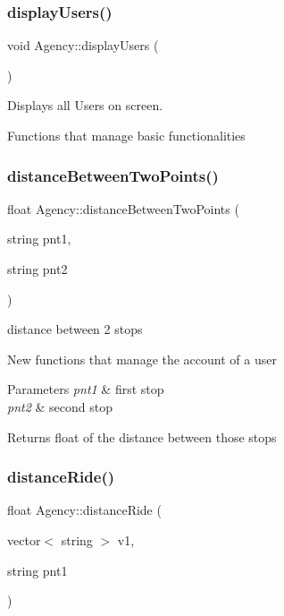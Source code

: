 \subsubsection{\texorpdfstring{display\+Users()}{displayUsers()}}
{\footnotesize\ttfamily void Agency\+::display\+Users (\begin{DoxyParamCaption}{ }\end{DoxyParamCaption})}



Displays all Users on screen. 

Functions that manage basic functionalities \mbox{\label{class_agency_a4efd6041c1293f0366b76356c05e3520}} 
\subsubsection{\texorpdfstring{distance\+Between\+Two\+Points()}{distanceBetweenTwoPoints()}}
{\footnotesize\ttfamily float Agency\+::distance\+Between\+Two\+Points (\begin{DoxyParamCaption}\item[{string}]{pnt1,  }\item[{string}]{pnt2 }\end{DoxyParamCaption})}



distance between 2 stops 

New functions that manage the account of a user 
\begin{DoxyParams}{Parameters}
{\em pnt1} & first stop \\
\hline
{\em pnt2} & second stop \\
\hline
\end{DoxyParams}
\begin{DoxyReturn}{Returns}
float of the distance between those stops 
\end{DoxyReturn}
\mbox{\label{class_agency_a4a3c0e75130deeba5f9fe8dc4cec0468}} 
\subsubsection{\texorpdfstring{distance\+Ride()}{distanceRide()}}
{\footnotesize\ttfamily float Agency\+::distance\+Ride (\begin{DoxyParamCaption}\item[{vector$<$ string $>$}]{v1,  }\item[{string}]{pnt1 }\end{DoxyParamCaption})}



